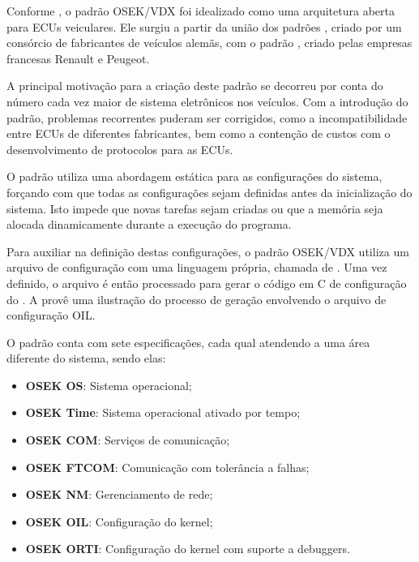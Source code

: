 Conforme , o padrão OSEK/VDX foi idealizado como uma arquitetura aberta para ECUs veiculares. Ele surgiu a partir da união dos padrões , criado por um consórcio de fabricantes de veículos alemãs, com o padrão , criado pelas empresas francesas Renault e Peugeot. 

A principal motivação para a criação deste padrão se decorreu por conta do número cada vez maior de sistema eletrônicos nos veículos. Com a introdução do padrão, problemas recorrentes puderam ser corrigidos, como a incompatibilidade entre ECUs de diferentes fabricantes, bem como a contenção de custos com o desenvolvimento de protocolos para as ECUs.

O padrão utiliza uma abordagem estática para as configurações do sistema, forçando com que todas as configurações sejam definidas antes da inicialização do sistema. Isto impede que novas tarefas sejam criadas ou que a memória seja alocada dinamicamente durante a execução do programa.

Para auxiliar na definição destas configurações, o padrão OSEK/VDX utiliza um arquivo de configuração com uma linguagem própria, chamada de . Uma vez definido, o arquivo é então processado para gerar o código em C de configuração do . A  provê uma ilustração do processo de geração envolvendo o arquivo de configuração OIL.


O padrão conta com sete especificações, cada qual atendendo a uma área diferente do sistema, sendo elas:

\begin{itemize}
	\item \textbf{OSEK OS}: Sistema operacional;
	\item \textbf{OSEK Time}: Sistema operacional ativado por tempo;
	\item \textbf{OSEK COM}: Serviços de comunicação;
	\item \textbf{OSEK FTCOM}: Comunicação com tolerância a falhas;
	\item \textbf{OSEK NM}: Gerenciamento de rede;
	\item \textbf{OSEK OIL}: Configuração do kernel;
	\item \textbf{OSEK ORTI}: Configuração do kernel com suporte a debuggers.
\end{itemize}

